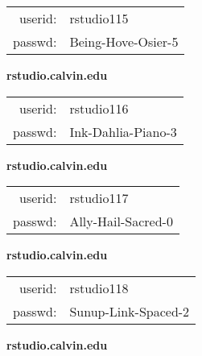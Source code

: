 \documentclass{article}\usepackage[]{graphicx}\usepackage[]{color}
\begin{document}
\begin{multicols}{3}
\begin{minipage}{.3\textwidth}
\begin{tabular}{rl}
userid: & rstudio115\\
passwd: & Being-Hove-Osier-5

\vspace{5mm}

\end{tabular}\end{minipage}

\vspace{5mm}

\begin{minipage}{.3\textwidth}
\centerline{\textbf{rstudio.calvin.edu}}
\medskip
\begin{tabular}{rl}

userid: & rstudio116\\
passwd: & Ink-Dahlia-Piano-3

\vspace{5mm}

\end{tabular}\end{minipage}

\vspace{5mm}

\begin{minipage}{.3\textwidth}
\centerline{\textbf{rstudio.calvin.edu}}
\medskip
\begin{tabular}{rl}

userid: & rstudio117\\
passwd: & Ally-Hail-Sacred-0

\vspace{5mm}

\end{tabular}\end{minipage}

\vspace{5mm}

\begin{minipage}{.3\textwidth}
\centerline{\textbf{rstudio.calvin.edu}}
\medskip
\begin{tabular}{rl}

userid: & rstudio118\\
passwd: & Sunup-Link-Spaced-2

\vspace{5mm}

\end{tabular}\end{minipage}

\vspace{5mm}

\begin{minipage}{.3\textwidth}
\centerline{\textbf{rstudio.calvin.edu}}
\medskip
\begin{tabular}{rl}


\end{tabular}
\end{minipage}
\end{multicols}
\end{document}
